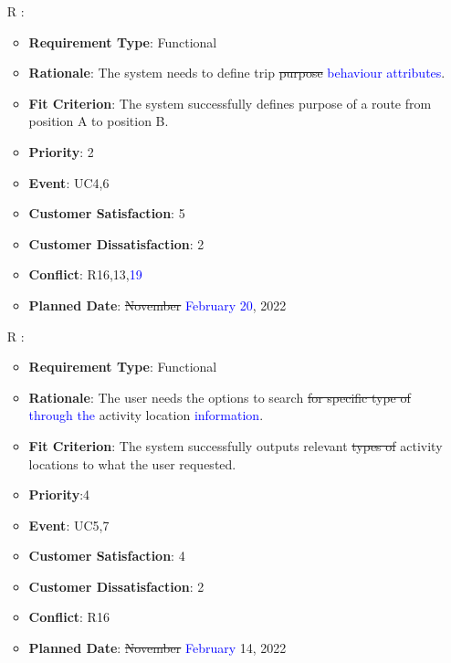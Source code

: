 \documentclass[12pt, titlepage]{article}
\newcounter{reqnum} %
\begin{document}
\begin{itemize}
\item[R\refstepcounter{reqnum}\thereqnum
\label{R_Inputs_1}:] 
\begin{itemize}
    \item \textbf{Requirement Type}: Functional
    \item \textbf{Rationale}: The system needs to define trip \sout{purpose} \textcolor{blue}{ behaviour attributes}. 
    \item \textbf{Fit Criterion}: The system successfully defines purpose of a route from position A to position B.
    \item \textbf{Priority}: 2
    \item \textbf{Event}: UC4,6
    \item \textbf{Customer Satisfaction}: 5
    \item \textbf{Customer Dissatisfaction}: 2
    \item \textbf{Conflict}: R16,13,\textcolor{blue}{19}
    \item \textbf{Planned Date}: \sout{November} \textcolor{blue}{February 20}, 2022
\end{itemize}

\item[R\refstepcounter{reqnum}\thereqnum
\label{R_Inputs_1}:] 
\begin{itemize}
    \item \textbf{Requirement Type}: Functional
    \item \textbf{Rationale}: The user needs the options to search \sout{for specific type of} \textcolor{blue}{through the} activity location \textcolor{blue}{information}.
    \item \textbf{Fit Criterion}: The system successfully outputs relevant \sout{types of} activity locations to what the user requested. 
    \item \textbf{Priority}:4
    \item \textbf{Event}: UC5,7
    \item \textbf{Customer Satisfaction}: 4
    \item \textbf{Customer Dissatisfaction}: 2
    \item \textbf{Conflict}: R16
    \item \textbf{Planned Date}: \sout{November} \textcolor{blue}{February} 14, 2022
\end{itemize}


\end{itemize}
\end{document}
